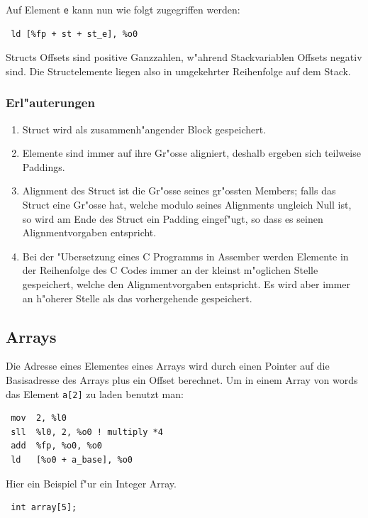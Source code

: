 \documentclass[german, 10pt, a4paper, twocolumn]{scrartcl}
\begin{document}
Auf Element \verb#e# kann nun wie folgt zugegriffen werden:
\begin{verbatim}
 ld [%fp + st + st_e], %o0
\end{verbatim}

Structs Offsets sind positive Ganzzahlen, w"ahrend Stackvariablen Offsets negativ sind. Die Structelemente liegen also in umgekehrter Reihenfolge auf dem Stack.\\

\subsubsection{Erl"auterungen}

\begin{enumerate}
	\item Struct wird als zusammenh"angender Block gespeichert.
	\item Elemente sind immer auf ihre Gr"osse aligniert, deshalb ergeben sich teilweise Paddings.
	\item Alignment des Struct ist die Gr"osse seines gr"ossten Members; falls das Struct eine Gr"osse hat, welche modulo seines Alignments ungleich Null ist, so wird am Ende des Struct ein Padding eingef"ugt, so dass es seinen Alignmentvorgaben entspricht.
	\item Bei der "Ubersetzung eines C Programms in Assember werden Elemente in der Reihenfolge des C Codes immer an der kleinst m"oglichen Stelle gespeichert, welche den Alignmentvorgaben entspricht. Es wird aber immer an h"oherer Stelle als das vorhergehende gespeichert.
\end{enumerate}

\subsection{Arrays}

Die Adresse eines Elementes eines Arrays wird durch einen Pointer auf die Basisadresse des Arrays plus ein Offset berechnet. Um in einem Array von words das Element \verb#a[2]# zu laden benutzt man:
\begin{verbatim}
 mov  2, %l0
 sll  %l0, 2, %o0 ! multiply *4
 add  %fp, %o0, %o0
 ld   [%o0 + a_base], %o0
\end{verbatim}

Hier ein Beispiel f"ur ein Integer Array.

\begin{verbatim}
 int array[5];
\end{verbatim}
\end{document}

